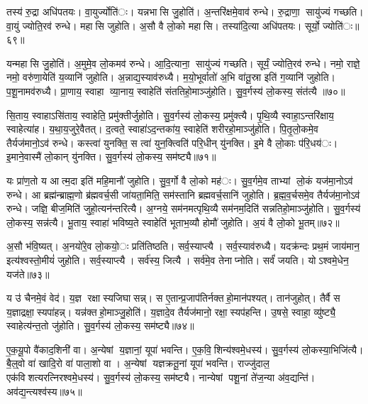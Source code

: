 तस्य॑ रु॒द्रा अधि॑पतयः। वा॒युर्ज्योति॑ः। यन्नभासि जु॒होति॑। अ॒न्तरि॑क्षमे॒वाव॑ रुन्धे। रु॒द्राणा॒ सायु॑ज्यं गच्छति। वा॒युं ज्योति॒रव॑ रुन्धे। महासि जुहोति। अ॒सौ वै लो॒को महासि। तस्या॑दि॒त्या अधि॑पतयः। सूर्यो॒ ज्योति॑ः॥६९॥

यन्महासि जु॒होति॑। अ॒मुमे॒व लो॒कमव॑ रुन्धे। आ॒दि॒त्याना॒ सायु॑ज्यं गच्छति। सूर्यं॒ ज्योति॒रव॑ रुन्धे। नमो॒ राज्ञे॒ नमो॒ वरु॑णा॒येति॑ य॒व्यानि॑ जुहोति। अ॒न्नाद्य॒स्याव॑रुध्यै। म॒यो॒भूर्वातो॑ अ॒भि वा॑तू॒स्रा इति॑ ग॒व्यानि॑ जुहोति। प॒शू॒नामव॑रुध्यै। प्रा॒णाय॒ स्वाहा व्या॒नाय॒ स्वाहेति॑ संततिहो॒माञ्जु॑होति। सु॒व॒र्गस्य॑ लो॒कस्य॒ संत॑त्यै ॥७०॥

सि॒ताय॒ स्वाहाऽसि॑ताय॒ स्वाहेति॒ प्रमु॑क्तीर्जुहोति। सु॒व॒र्गस्य॑ लो॒कस्य॒ प्रमु॑क्त्यै। पृ॒थि॒व्यै स्वाहा॒ऽन्तरि॑क्षाय॒ स्वाहेत्या॑ह। य॒था॒य॒जुरे॒वैतत्। द॒त्वते॒ स्वाहा॑ऽद॒न्तका॑य॒ स्वाहेति॑ शरीरहो॒माञ्जु॑होति। पि॒तृ॒लो॒कमे॒व तैर्यज॑मानो॒ऽव॑ रुन्धे। कस्त्वा॑ युनक्ति॒ स त्वा॑ युन॒क्त्विति॑ परि॒धीन् यु॑नक्ति। इ॒मे वै लो॒काः प॑रि॒धय॑ः। इ॒माने॒वास्मै॑ लो॒कान् यु॑नक्ति। सु॒व॒र्गस्य॑ लो॒कस्य॒ सम॑ष्ट्यै॥७१॥

यः प्रा॑ण॒तो य आत्म॒दा इति॑ महि॒मानौ॑ जुहोति। सु॒व॒र्गो वै लो॒को मह॑ः। सु॒व॒र्गमे॒व ताभ्यां लो॒कं यज॑मा॒नोऽव॑ रुन्धे। आ ब्रह्म॑न्ब्राह्म॒णो ब्र॑ह्मवर्च॒सी जा॑यता॒मिति॒ सम॑स्तानि ब्रह्मवर्च॒सानि॑ जुहोति। ब्र॒ह्म॒व॒र्चसमे॒व तैर्यज॑मा॒नोऽव॑ रुन्धे। जज्ञि॒ बीज॒मिति॑ जुहो॒त्यन॑न्तरित्यै। अ॒ग्नये॒ सम॑नमत्पृथि॒व्यै सम॑नम॒दिति॑ सन्नतिहो॒माञ्जु॑होति। सु॒व॒र्गस्य॑ लो॒कस्य॒ सन्न॑त्यै। भू॒ताय॒ स्वाहा॑ भविष्य॒ते स्वाहेति॑ भूताभ॒व्यौ होमौ॑ जुहोति। अ॒यं वै लो॒को भू॒तम्॥७२॥

अ॒सौ भ॑वि॒ष्यत्। अ॒नयो॑रे॒व लो॒कयो॒ः प्रति॑तिष्ठति। सर्व॒स्याप्त्यै। सर्व॒स्याव॑रुध्यै। यदक्र॑न्दः प्रथ॒मं जाय॑मान॒ इत्य॑श्वस्तो॒मीयं॑ जुहोति। सर्व॒स्याप्त्यै। सर्व॑स्य॒ जित्यै। सर्व॑मे॒व तेनाप्नोति। सर्वं॑ जयति। योऽश्वमे॒धेन॒ यज॑ते॥७३॥

य उ॑ चैनमे॒वं वेद॑। य॒ज्ञ रक्षास्यजिघासन्न्। स ए॒तान्प्र॒जाप॑तिर्नक्तहो॒मान॑पश्यत्। तान॑जुहोत्। तैर्वै स य॒ज्ञाद्रक्षा॒स्यपा॑हन्न्। यन्न॑क्तहो॒माञ्जु॒होति॑। य॒ज्ञादे॒व तैर्यज॑मानो॒ रक्षा॒स्यप॑हन्ति। उ॒षसे॒ स्वाहा॒ व्यु॑ष्ट्यै॒ स्वाहेत्य॑न्त॒तो जु॑होति। सु॒व॒र्गस्य॑ लो॒कस्य॒ सम॑ष्ट्यै॥७४॥


ए॒क॒यू॒पो वै॑काद॒शिनी॑ वा। अ॒न्येषां य॒ज्ञानां॒ यूपा॑ भवन्ति। ए॒क॒वि॒शिन्य॑श्वमे॒धस्य॑। सु॒व॒र्गस्य॑ लो॒कस्या॒भिजि॑त्यै। बै॒ल्॒वो वा॑ खादि॒रो वा॑ पाला॒शो वा। अ॒न्येषां यज्ञक्रतू॒नां यूपा॑ भवन्ति। राज्जु॑दाल॒ एक॑विशत्यरत्निरश्वमे॒धस्य॑। सु॒व॒र्गस्य॑ लो॒कस्य॒ सम॑ष्ट्यै। नान्येषां पशू॒नां ते॑ज॒न्या अ॑व॒द्यन्ति॑। अव॑द्य॒न्त्यश्व॑स्य॥७५॥

